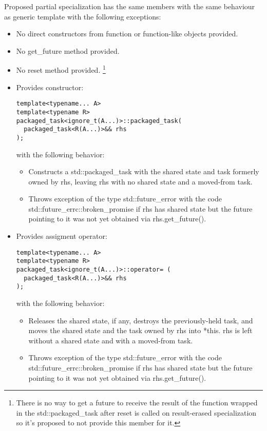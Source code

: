 \documentclass[ebook,openany,10pt,oneside,final]{memoir}
\begin{document}
Proposed partial specialization has the same members with the same behaviour as generic template
with the following exceptions:
\begin{itemize}
 \item No direct constructors from function or function-like objects provided.
 \item No \mbox{get_future} method provided.
 \item No reset method provided. \footnote{There is no way to get a future to receive the result of
the function wrapped in the \mbox{std::packaged_task} after reset is called on result-erased
specialization so it's proposed to not provide this member for it.}
 \item Provides constructor:
 \begin{lstlisting}
template<typename... A>
template<typename R>
packaged_task<ignore_t(A...)>::packaged_task(
  packaged_task<R(A...)>&& rhs
);
 \end{lstlisting}
 with the following behavior:
 \begin{itemize}
  \item Constructs a std::packaged_task with the shared state and task formerly owned by rhs,
leaving rhs with no shared state and a moved-from task.
  \item Throws exception of the type \mbox{std::future_error} with the code
\mbox{std::future_errc::broken_promise} if rhs has shared state but the future pointing to it was
not yet obtained via \mbox{rhs.get_future()}.
 \end{itemize}

 \item Provides assigment operator:
 \begin{lstlisting}
template<typename... A>
template<typename R>
packaged_task<ignore_t(A...)>::operator= (
  packaged_task<R(A...)>&& rhs
);
 \end{lstlisting}
 with the following behavior:
 \begin{itemize}
  \item Releases the shared state, if any, destroys the previously-held task, and moves the shared
state and the task owned by rhs into *this. rhs is left without a shared state and with a moved-from
task.
  \item Throws exception of the type \mbox{std::future_error} with the code
\mbox{std::future_errc::broken_promise} if rhs has shared state but the future pointing to it was
not yet obtained via \mbox{rhs.get_future()}.
 \end{itemize}
\end{itemize}
\end{document}
